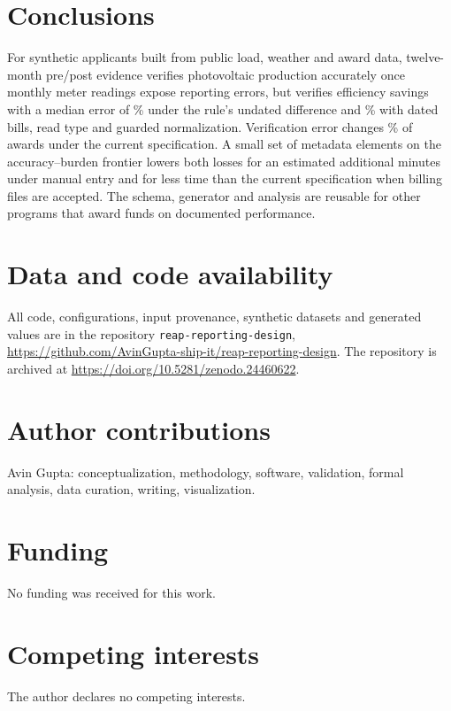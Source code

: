 \documentclass[preprint,12pt]{elsarticle}
\begin{document}
\section{Conclusions}

For synthetic applicants built from public load, weather and award data, twelve-month
pre/post evidence verifies photovoltaic production accurately once monthly meter readings
expose reporting errors, but verifies efficiency savings with a median error of
\PathUndatedNormalMedian\% under the rule's undated difference and
\PathNormMergedNormalMedian\% with dated bills, read type and guarded normalization.
Verification error changes \SelCurrentValidatedMid\% of awards under the current
specification. A small set of metadata elements on the accuracy--burden frontier lowers
both losses for an estimated \RecBurdenIncrease{} additional minutes under manual entry
and for less time than the current specification when billing files are accepted. The
schema, generator and analysis are reusable for other programs that award funds on
documented performance.

\section*{Data and code availability}
All code, configurations, input provenance, synthetic datasets and generated values are in
the repository \texttt{reap-reporting-design},
\url{https://github.com/AvinGupta-ship-it/reap-reporting-design}. The repository is archived
at \url{https://doi.org/10.5281/zenodo.24460622}.

\section*{Author contributions}
Avin Gupta: conceptualization, methodology, software, validation, formal analysis, data
curation, writing, visualization.

\section*{Funding}
No funding was received for this work.

\section*{Competing interests}
The author declares no competing interests.


\end{document}
